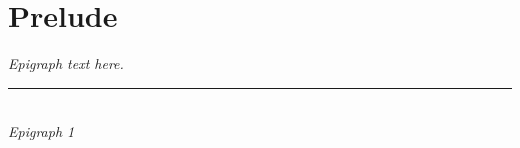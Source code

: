 \chapter*{Prelude}

\begin{flushleft}
	\emph{Epigraph text here.}\\
	\rule[0pt]{15em}{0.5pt}\\
	\emph{Epigraph 1}
\end{flushleft}

\vspace{2em}

